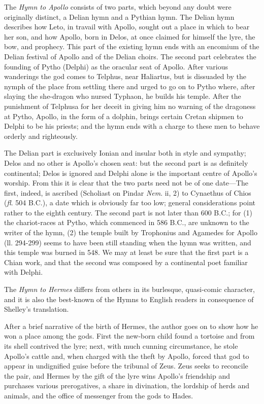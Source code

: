 The \emph{Hymn to Apollo} consists of two parts, which beyond any doubt were
originally distinct, a Delian hymn and a Pythian hymn. The Delian hymn
describes how Leto, in travail with Apollo, sought out a place in which to bear
her son, and how Apollo, born in Delos, at once claimed for himself the lyre,
the bow, and prophecy. This part of the existing hymn ends with an encomium of
the Delian festival of Apollo and of the Delian choirs. The second part
celebrates the founding of Pytho (Delphi) as the oracular seat of Apollo. After
various wanderings the god comes to Telphus, near Haliartus, but is dissuaded
by the nymph of the place from settling there and urged to go on to Pytho
where, after slaying the she-dragon who nursed Typhaon, he builds his temple.
After the punishment of Telphusa for her deceit in giving him no warning of the
dragoness at Pytho, Apollo, in the form of a dolphin, brings certain Cretan
shipmen to Delphi to be his priests; and the hymn ends with a charge to these
men to behave orderly and righteously.

The Delian part is exclusively Ionian and insular both in style and sympathy;
Delos and no other is Apollo’s chosen seat: but the second part is as
definitely continental; Delos is ignored and Delphi alone is the important
centre of Apollo’s worship. From this it is clear that the two parts need
not be of one date—The first, indeed, is ascribed (Scholiast on Pindar
\emph{Nem}. ii, 2) to Cynaethus of Chios (\emph{fl}. 504 B.C.), a date which is
obviously far too low; general considerations point rather to the eighth
century. The second part is not later than 600 B.C.; for (1) the chariot-races
at Pytho, which commenced in 586 B.C., are unknown to the writer of the hymn,
(2) the temple built by Trophonius and Agamedes for Apollo (ll. 294-299) seems
to have been still standing when the hymn was written, and this temple was
burned in 548. We may at least be sure that the first part is a Chian work, and
that the second was composed by a continental poet familiar with Delphi.

The \emph{Hymn to Hermes} differs from others in its burlesque, quasi-comic
character, and it is also the best-known of the Hymns to English readers in
consequence of Shelley’s translation.

After a brief narrative of the birth of Hermes, the author goes on to show how
he won a place among the gods. First the new-born child found a tortoise and
from its shell contrived the lyre; next, with much cunning circumstance, he
stole Apollo’s cattle and, when charged with the theft by Apollo, forced
that god to appear in undignified guise before the tribunal of Zeus. Zeus seeks
to reconcile the pair, and Hermes by the gift of the lyre wins Apollo’s
friendship and purchases various prerogatives, a share in divination, the
lordship of herds and animals, and the office of messenger from the gods to
Hades.

